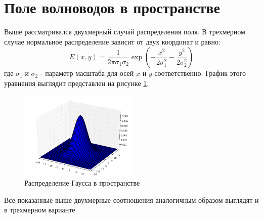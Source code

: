 \section{Поле волноводов в пространстве}

Выше рассматривался двухмерный случай распределения поля. В трехмерном случае нормальное распределение зависит от двух координат и равно:
\begin{equation}
  \label{gauss3d}
  E(x,y)=\frac{1}{2\pi\sigma_1\sigma_2}\exp\left(-\frac{x^2}{2\sigma_1^2}-\frac{y^2}{2\sigma_2^2}\right)
\end{equation}
где $\sigma_1$ и $\sigma_2$ - параметр масштаба для осей $x$ и $y$ соответственно. График этого уравнения выглядит представлен на рисунке \ref{gauss3dPlot}.

\begin{figure}[h!]
	\includegraphics[width=0.5\textwidth]{img/gauss3d.png}
	\caption{Распределение Гаусса в пространстве}
	\label{gauss3dPlot}
\end{figure}

Все показанные выше двухмерные соотношения аналогичным образом выглядят и в трехмерном варианте
